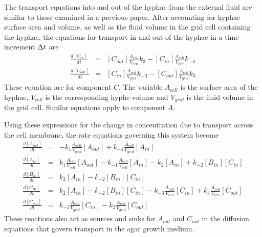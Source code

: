 \documentclass[12pt]{article}
\begin{document}

The transport equations into and out of the hyphae from the external fluid are similar to those
examined in a previous paper.
After accounting for hyphae surface area and volume, as well as the fluid volume in the grid cell
containing the hyphae, the equations for transport in and out of the hyphae in a time increment
$\Delta t$ are
\begin{eqnarray*}
\frac{d [C_{in}]}{dt} &=& [C_{out}]\frac{A_{cell}}{V_{cell}}k_3 - [C_{in}]\frac{A_{cell}}{V_{cell}}
k_{-3} \\
\frac{d[C_{out}]}{dt} &=& [C_{in}]\frac{A_{cell}}{V_{grid}}k_{-3} - [C_{out}]\frac{A_{cell}}{V_{grid}}
k_{3}
\end{eqnarray*}
These equation are for component $C$. The variable $A_{cell}$ is the surface area of the hyphae,
$V_{cell}$ is the corresponding hyphe volume and $V_{grid}$ is the fluid volume in the grid cell.
Similar equations apply to component $A$.

Using these expressions for the change in concentration due to transport across the cell membrane, the
rate equations governing this system become
\begin{eqnarray*}
\frac{d [A_{out}]}{d t} &=&-k_1\frac{A_{cell}}{V_{grid}} [A_{out}]
+k_{-1}\frac{A_{cell}}{V_{grid}} [A_{in}] \\
\frac{d [A_{in}]}{d t} &=&k_1\frac{A_{cell}}{V_{cell}} [A_{out}]
-k_{-1}\frac{A_{cell}}{V_{cell}} [A_{in}] - k_2 [A_{in}]
 + k_{-2}[B_{in}][C_{in}]\\
\frac{d [B_{in}]}{d t} &=&k_2 [A_{in}] - k_{-2}[B_{in}][C_{in}]\\
\frac{d [C_{in}]}{d t} &=&k_2 [A_{in}] - k_{-2}[B_{in}][C_{in}]
-k_{-3} \frac{A_{cell}}{V_{cell}}[C_{in}]
+ k_3\frac{A_{cell}}{V_{cell}} [C_{out}] \\
\frac{d [C_{out}]}{d t} &=&k_{-3} \frac{A_{cell}}{V_{grid}}[C_{in}]
-k_3\frac{A_{cell}}{V_{grid}} [C_{out}]
\end{eqnarray*}
These reactions also act as sources and sinks for $A_{out}$ and $C_{out}$ in the diffusion
equations that govern transport in the agar growth medium.
\end{document}
